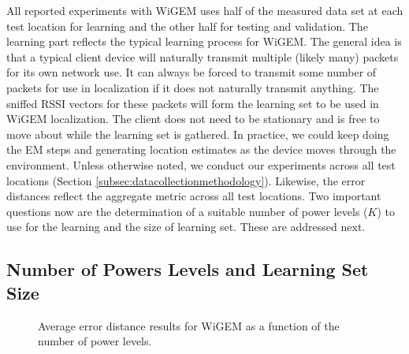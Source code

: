 All reported experiments with WiGEM uses half of the measured data set at each test location for learning and the other half for testing and validation. The learning part reflects the typical learning process for WiGEM.
The general idea is that a typical client device will naturally transmit multiple (likely many) packets for its own network use. It can always be forced to transmit some number of packets for use in localization if it does not naturally transmit anything. The sniffed RSSI vectors for these packets will form the learning set to be used in WiGEM localization. The client does not need to be stationary and is free to move about while the learning set is gathered. In practice, we could keep doing the EM steps and generating location estimates as the device moves through the environment.  Unless otherwise noted, we conduct our experiments across all test locations (Section \ref{subsec:datacollectionmethodology}). Likewise, the error distances reflect the aggregate metric across all test locations.  Two important questions now are the determination of a suitable number of power levels ($K$) to use for the learning and the size of learning set. These are addressed next.

%

\subsection{Number of Powers Levels and Learning Set Size}
\label{subsec:numberofpowerlevelstouseingem}

\begin{figure}[h!]
	\centering
	\caption{Average error distance results for WiGEM
	as a function of the number of power levels.}
	\label{fig:powerlevelsvserrordistance}
\end{figure}

